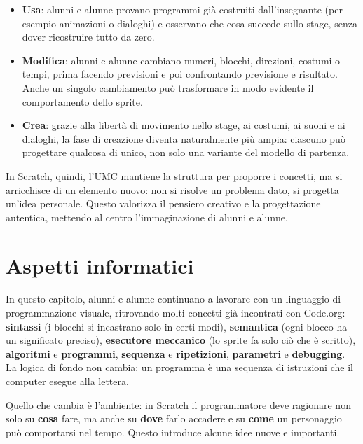 \begin{itemize}
\item
  \textbf{Usa}: alunni e alunne provano programmi già costruiti dall'insegnante (per esempio animazioni o dialoghi) e osservano che cosa succede sullo stage, senza dover ricostruire tutto da zero.
\item
  \textbf{Modifica}: alunni e alunne cambiano numeri, blocchi, direzioni, costumi o tempi, prima facendo previsioni e poi confrontando previsione e risultato. Anche un singolo cambiamento può trasformare in modo evidente il comportamento dello sprite.
\item
  \textbf{Crea}: grazie alla libertà di movimento nello stage, ai costumi, ai suoni e ai dialoghi, la fase di creazione diventa naturalmente più ampia: ciascuno può progettare qualcosa di unico, non solo una variante del modello di partenza.
\end{itemize}

In Scratch, quindi, l'UMC mantiene la struttura per proporre i concetti, ma si arricchisce di un elemento nuovo: non si risolve un problema dato, si progetta un'idea personale. Questo valorizza il pensiero creativo e la progettazione autentica, mettendo al centro l'immaginazione di alunni e alunne.

\section{Aspetti informatici }\label{aspetti-informatici-4}

In questo capitolo, alunni e alunne continuano a lavorare con un linguaggio di programmazione visuale, ritrovando molti concetti già incontrati con Code.org: \textbf{sintassi} (i blocchi si incastrano solo in certi modi), \textbf{semantica} (ogni blocco ha un significato preciso), \textbf{esecutore meccanico} (lo sprite fa solo ciò che è scritto), \textbf{algoritmi} e \textbf{programmi}, \textbf{sequenza} e \textbf{ripetizioni}, \textbf{parametri} e \textbf{debugging}. La logica di fondo non cambia: un programma è una sequenza di istruzioni che il computer esegue alla lettera.

Quello che cambia è l'ambiente: in Scratch il programmatore deve ragionare non solo su \textbf{cosa} fare, ma anche su \textbf{dove} farlo accadere e su \textbf{come} un personaggio può comportarsi nel tempo. Questo introduce alcune idee nuove e importanti.


